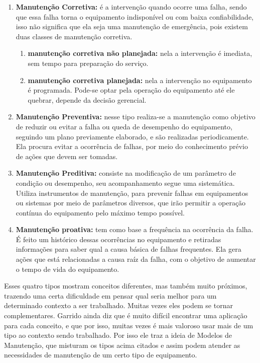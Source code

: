 \begin{enumerate}
	\item \textbf{Manutenção Corretiva:} é a intervenção quando ocorre uma falha, sendo que essa falha torna o equipamento indisponível ou com baixa confiabilidade, isso não significa que ela seja uma manutenção de emergência, pois existem duas classes de manutenção corretiva.
		\begin{enumerate}
			\item \textbf{manutenção corretiva não planejada:} nela a intervenção é imediata, sem tempo para preparação do serviço.
			\item \textbf{manutenção corretiva planejada:} nela a intervenção no equipamento é programada. Pode-se optar pela operação do equipamento até ele quebrar, depende da decisão gerencial.
		\end{enumerate}
	\item \textbf{Manutenção Preventiva:} nesse tipo realiza-se a manutenção como objetivo de reduzir ou evitar a falha ou queda de desempenho do equipamento, seguindo um plano previamente elaborado, e são realizadas periodicamente. Ela procura evitar a ocorrência de falhas, por meio do conhecimento prévio de ações que devem ser tomadas.
	\item \textbf{Manutenção Preditiva:} consiste na modificação de um parâmetro de condição ou desempenho, seu acompanhamento segue uma sistemática. Utiliza instrumentos de manutenção, para prevenir falhas em equipamentos ou sistemas por meio de parâmetros diversos, que irão permitir a operação contínua do equipamento pelo máximo tempo possível.
	\item \textbf{Manutenção proativa:} tem como base a frequência na ocorrência da falha. É feito um histórico dessas ocorrências no equipamento e retiradas informações para saber qual a causa básica de falhas frequentes. Ela gera ações que está relacionadas a causa raíz da falha, com o objetivo de aumentar o tempo de vida do equipamento.
\end{enumerate}

Esses quatro tipos mostram conceitos diferentes, mas também muito próximos, trazendo uma certa dificuldade em pensar qual seria melhor para um determinado contexto a ser trabalhado. Muitas vezes eles podem se tornar complementares. Garrido \cite{garrido} ainda diz que é muito difícil encontrar uma aplicação para cada conceito, e que por isso, muitas vezes é mais valoroso usar mais de um tipo ao contexto sendo trabalhado. Por isso ele traz a ideia de Modelos de Manutenção, que misturam os tipos acima citados e assim podem atender as necessidades de manutenção de um certo tipo de equipamento.

